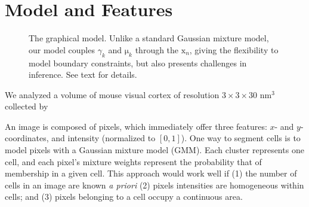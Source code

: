 \documentclass[english]{article}
\newcommand{\plate}[4]{
\begin{pgfonlayer}{b}
\node (invis#1) [draw, color=white, inner sep=6pt,rectangle,fit=#2] {};
\end{pgfonlayer}\begin{pgfonlayer}{f}
\node (capt#1) [ below left=0 pt of invis#1.south east, xshift=1pt,yshift=1pt] {\footnotesize{#3}};
\node (#1) [draw,inner sep=1pt, rectangle,fit=(invis#1) (capt#1),#4] {};
\end{pgfonlayer}
}
\newcommand{\+}[1]{\ensuremath{\boldsymbol{\mathrm{#1}}}}
\begin{document}

\section{Model and Features}
\label{sec:model}
\begin{figure}
\centering

\caption{The graphical model. Unlike a standard Gaussian mixture model, our model couples $\gamma_k$ and $\+\mu_k$ through the $\+x_n$, giving the flexibility to model boundary constraints, but also presents challenges in inference. See text for details.}\label{fig:model}
\end{figure}

We analyzed a  volume of mouse visual cortex of resolution $3 \times 3 \times 30 \text{ nm}^3$ collected by 

An image is composed of pixels, which immediately offer three features: $x$- and $y$- coordinates, and intensity (normalized to $[0,1]$). One way to segment cells is to model pixels with a Gaussian mixture model (GMM). Each cluster represents one cell, and each pixel's mixture weights represent the probability that of membership in a given cell. This approach would work well if (1) the number of cells in an image are known \emph{a priori} (2) pixels intensities are homogeneous within cells; and (3) pixels belonging to a cell occupy a continuous area.
\end{document}
